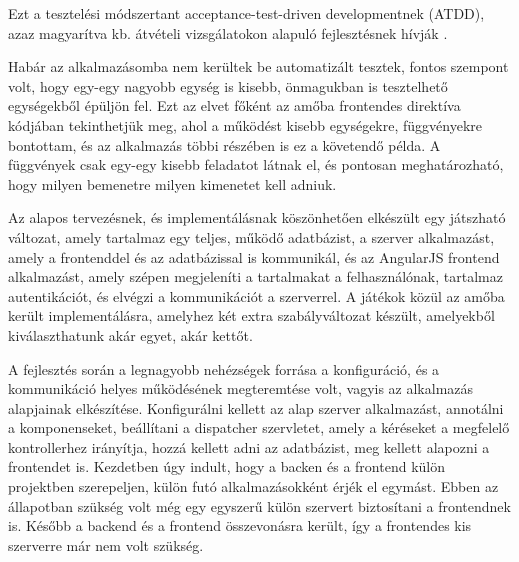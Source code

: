Ezt a tesztelési módszertant acceptance-test-driven developmentnek (ATDD), azaz magyarítva kb. átvételi vizsgálatokon alapuló fejlesztésnek hívják \cite{atdd}.


Habár az alkalmazásomba nem kerültek be automatizált tesztek, fontos szempont volt, hogy egy-egy nagyobb egység is kisebb, önmagukban is tesztelhető egységekből épüljön fel. Ezt az elvet főként az amőba frontendes direktíva kódjában tekinthetjük meg, ahol a működést kisebb egységekre, függvényekre bontottam, és az alkalmazás többi részében is ez a követendő példa. A függvények csak egy-egy kisebb feladatot látnak el, és pontosan meghatározható, hogy milyen bemenetre milyen kimenetet kell adniuk.


Az alapos tervezésnek, és implementálásnak köszönhetően elkészült egy játszható változat, amely tartalmaz egy teljes, működő adatbázist, a szerver alkalmazást, amely a frontenddel és az adatbázissal is kommunikál, és az AngularJS frontend alkalmazást, amely szépen megjeleníti a tartalmakat a felhasználónak, tartalmaz autentikációt, és elvégzi a kommunikációt a szerverrel.  A játékok közül az amőba került implementálásra, amelyhez két extra szabályváltozat készült, amelyekből kiválaszthatunk akár egyet, akár kettőt.

A fejlesztés során a legnagyobb nehézségek forrása a konfiguráció, és a kommunikáció helyes működésének megteremtése volt, vagyis az alkalmazás alapjainak elkészítése. Konfigurálni kellett az alap szerver alkalmazást, annotálni a komponenseket, beállítani a dispatcher szervletet, amely a kéréseket a megfelelő kontrollerhez irányítja, hozzá kellett adni az adatbázist, meg kellett alapozni a frontendet is. Kezdetben úgy indult, hogy a backen és a frontend külön projektben szerepeljen, külön futó alkalmazásokként érjék el egymást. Ebben az állapotban szükség volt még egy egyszerű külön szervert biztosítani a frontendnek is. Később a backend és a frontend összevonásra került, így a frontendes kis szerverre már nem volt szükség.

